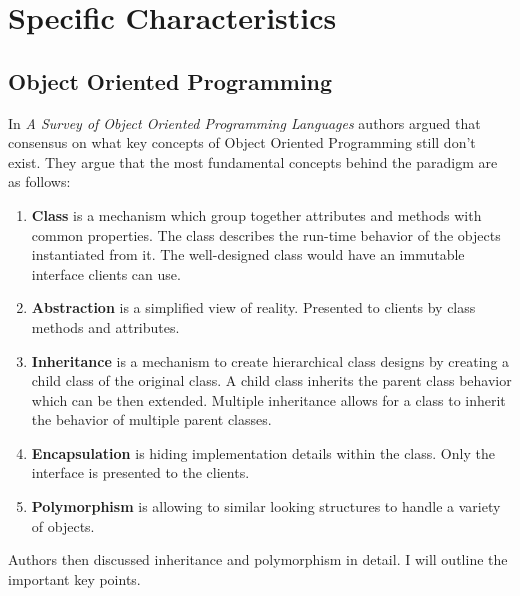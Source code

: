 \documentclass[12pt,twoside,a4paper]{report}
\begin{document}
\section{Specific Characteristics}\label{2.3}

\subsection{Object Oriented Programming}\label{2.3.1}
In \emph{A Survey of Object Oriented Programming Languages}\cite{13} authors argued that consensus on what key concepts of Object Oriented Programming still don't exist. They argue that the most fundamental concepts behind the paradigm are as follows:
\begin{enumerate}\itemsep1pt \parskip0pt 
\item \textbf{Class} is a mechanism which group together attributes and methods with common properties. The class describes the run-time behavior of the objects instantiated from it. The well-designed class would have an immutable interface clients can use.
\item \textbf{Abstraction} is a simplified view of reality. Presented to clients by class methods and attributes.
\item \textbf{Inheritance} is a mechanism to create hierarchical class designs by creating a child class of the original class. A child class inherits the parent class behavior which can be then extended. Multiple inheritance allows for a class to inherit the behavior of multiple parent classes.
\item \textbf{Encapsulation} is hiding implementation details within the class. Only the interface is presented to the
clients.
\item \textbf{Polymorphism} is allowing to similar looking structures to handle a variety of objects.
\end{enumerate}
Authors then discussed inheritance and polymorphism in detail. I will outline the important key points.
\end{document}
